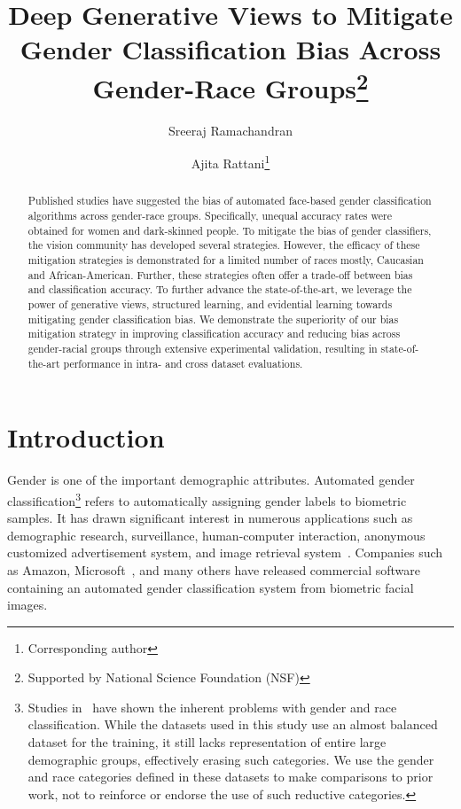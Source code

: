 \documentclass[runningheads]{llncs}
\begin{document}
\title{Deep Generative Views to Mitigate Gender Classification Bias Across Gender-Race Groups\thanks{Supported by National Science Foundation (NSF)}}
\author{Sreeraj Ramachandran\and
Ajita Rattani\thanks{Corresponding author}}
\maketitle              \begin{abstract}
Published studies have suggested the bias of automated face-based gender classification algorithms across gender-race groups. Specifically, unequal accuracy rates were obtained for women and dark-skinned people. To mitigate the bias of gender classifiers, the vision community has developed several strategies. However, the efficacy of these mitigation strategies is demonstrated for a limited number of races mostly, Caucasian and African-American. Further, these strategies often offer a trade-off between bias and classification accuracy. To further advance the state-of-the-art, we leverage the power of generative views, structured learning, and evidential learning towards mitigating gender classification bias. We demonstrate the superiority of our bias mitigation strategy in improving classification accuracy and reducing bias across gender-racial groups through extensive experimental validation, resulting in state-of-the-art performance in intra- and cross dataset evaluations.

\end{abstract}


\section{Introduction}

Gender is one of the important demographic attributes. Automated gender classification\footnote{Studies in~\cite{bowker,keyes} have shown the inherent problems with gender and race classification. While the datasets used in this study use an almost balanced dataset for the training, it still lacks representation of entire large demographic groups, effectively erasing such categories. We use the gender and race categories defined in these datasets to make comparisons to prior work, not to reinforce or endorse the use of such reductive categories.} refers to automatically assigning gender labels to biometric samples. It has drawn significant interest in numerous applications such as demographic research, surveillance, human-computer interaction, anonymous customized advertisement system, and image retrieval system~\cite{nist_gender,wayman1997large,article1,DBLP:conf/fgr/JainH04}. Companies such as Amazon, Microsoft~\cite{gender_shades}, and many others have released commercial software containing an automated gender classification system from biometric facial images. 
\end{document}
